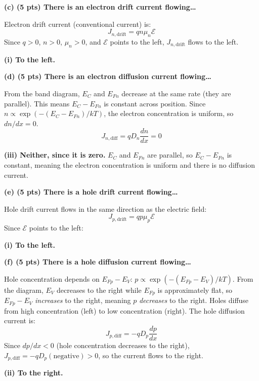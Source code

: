 \documentclass[11pt]{article}
\begin{document}
\textbf{(c) (5 pts) There is an electron drift current flowing\ldots}

Electron drift current (conventional current) is:
\[
  J_{n,\text{drift}} = qn\mu_n \mathcal{E}
\]
Since $q > 0$, $n > 0$, $\mu_n > 0$, and $\mathcal{E}$ points to the left, $J_{n,\text{drift}}$ flows to the left.

\begin{answerbox}
  \textbf{(i) To the left.}
\end{answerbox}

\textbf{(d) (5 pts) There is an electron diffusion current flowing\ldots}

From the band diagram, $E_C$ and $E_{Fn}$ decrease at the same rate (they are parallel). This means $E_C - E_{Fn}$ is constant across position. Since $n \propto \exp(-(E_C - E_{Fn})/kT)$, the electron concentration is uniform, so $dn/dx = 0$.
\[
  J_{n,\text{diff}} = qD_n \frac{dn}{dx} = 0
\]

\begin{answerbox}
  \textbf{(iii) Neither, since it is zero.} $E_C$ and $E_{Fn}$ are parallel, so $E_C - E_{Fn}$ is constant, meaning the electron concentration is uniform and there is no diffusion current.
\end{answerbox}

\textbf{(e) (5 pts) There is a hole drift current flowing\ldots}

Hole drift current flows in the same direction as the electric field:
\[
  J_{p,\text{drift}} = qp\mu_p \mathcal{E}
\]
Since $\mathcal{E}$ points to the left:

\begin{answerbox}
  \textbf{(i) To the left.}
\end{answerbox}

\textbf{(f) (5 pts) There is a hole diffusion current flowing\ldots}

Hole concentration depends on $E_{Fp} - E_V$: $p \propto \exp(-(E_{Fp} - E_V)/kT)$. From the diagram, $E_V$ decreases to the right while $E_{Fp}$ is approximately flat, so $E_{Fp} - E_V$ \emph{increases} to the right, meaning $p$ \emph{decreases} to the right. Holes diffuse from high concentration (left) to low concentration (right). The hole diffusion current is:
\[
  J_{p,\text{diff}} = -qD_p \frac{dp}{dx}
\]
Since $dp/dx < 0$ (hole concentration decreases to the right), $J_{p,\text{diff}} = -qD_p(\text{negative}) > 0$, so the current flows to the right.

\begin{answerbox}
  \textbf{(ii) To the right.}
\end{answerbox}
\end{document}
